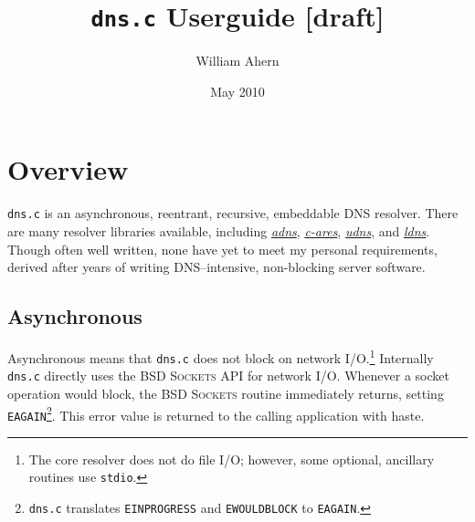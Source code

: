 \documentclass[11pt]{article}
\begin{document}
%
%
\newcommand*{\dnsc}[0]{\texttt{dns.c}\xspace}
\newcommand*{\lref}[1]{\hyperref[#1]{#1}\index{#1}}
\newcommand*{\dn}[1]{\texttt{#1}\xspace}
\newcommand*{\key}[1]{#1\index{#1}\xspace}

\newenvironment{todo}[1]{
	\begin{color}{red}
	\sf
	\begin{tabular}{|p{0.9\textwidth}|}
	\hline
	TODO---\uppercase{#1} \\\hline
	\index{TODO!\lowercase{#1}}
}{
	\\\hline
	\end{tabular}
	\end{color}
}

%
%
\title{\dnsc Userguide [draft]}
\date{May 2010}
\author{William Ahern}
\maketitle

\tableofcontents


\clearpage

\setcounter{page}{1}


\section{Overview}

\dnsc is an asynchronous, reentrant, recursive, embeddable DNS resolver.
There are many resolver libraries available, including
\href{http://www.chiark.greenend.org.uk/~ian/adns/}{\textit{adns}},
\href{http://c-ares.haxx.se/}{\textit{c-ares}},
\href{http://www.corpit.ru/mjt/udns.html}{\textit{udns}}, and
\href{http://nlnetlabs.nl/projects/ldns/}{\textit{ldns}}. Though often well
written, none have yet to meet my personal requirements, derived after years
of writing DNS--intensive, non-blocking server software.

\subsection{Asynchronous}

Asynchronous means that \dnsc does not block on network I/O.\footnote{The
core resolver does not do file I/O; however, some optional, ancillary
routines use \texttt{stdio}.} Internally \dnsc directly uses the \textsc{BSD
Sockets} API for network I/O. Whenever a socket operation would block, the
\textsc{BSD Sockets} routine immediately returns, setting
\texttt{EAGAIN}\footnote{\dnsc translates \texttt{EINPROGRESS}
and \texttt{EWOULDBLOCK} to \texttt{EAGAIN}.}.
This error value is returned to the calling application with haste.
\end{document}
